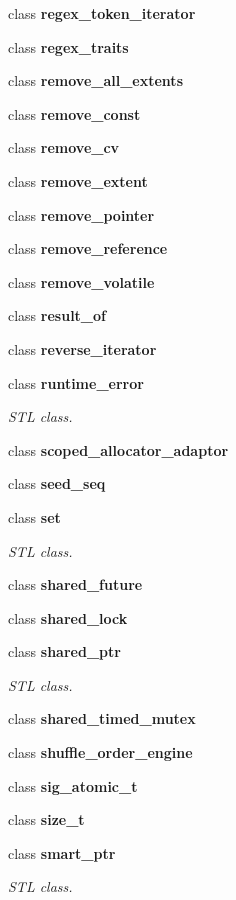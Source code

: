\begin{DoxyCompactItemize}
class \textbf{ regex\+\_\+token\+\_\+iterator}
\item 
class \textbf{ regex\+\_\+traits}
\item 
class \textbf{ remove\+\_\+all\+\_\+extents}
\item 
class \textbf{ remove\+\_\+const}
\item 
class \textbf{ remove\+\_\+cv}
\item 
class \textbf{ remove\+\_\+extent}
\item 
class \textbf{ remove\+\_\+pointer}
\item 
class \textbf{ remove\+\_\+reference}
\item 
class \textbf{ remove\+\_\+volatile}
\item 
class \textbf{ result\+\_\+of}
\item 
class \textbf{ reverse\+\_\+iterator}
\item 
class \textbf{ runtime\+\_\+error}
\begin{DoxyCompactList}\small\item\em S\+TL class. \end{DoxyCompactList}\item 
class \textbf{ scoped\+\_\+allocator\+\_\+adaptor}
\item 
class \textbf{ seed\+\_\+seq}
\item 
class \textbf{ set}
\begin{DoxyCompactList}\small\item\em S\+TL class. \end{DoxyCompactList}\item 
class \textbf{ shared\+\_\+future}
\item 
class \textbf{ shared\+\_\+lock}
\item 
class \textbf{ shared\+\_\+ptr}
\begin{DoxyCompactList}\small\item\em S\+TL class. \end{DoxyCompactList}\item 
class \textbf{ shared\+\_\+timed\+\_\+mutex}
\item 
class \textbf{ shuffle\+\_\+order\+\_\+engine}
\item 
class \textbf{ sig\+\_\+atomic\+\_\+t}
\item 
class \textbf{ size\+\_\+t}
\item 
class {\bfseries smart\+\_\+ptr}
\begin{DoxyCompactList}\small\item\em S\+TL class. \end{DoxyCompactList}\item 

\end{DoxyCompactItemize}
